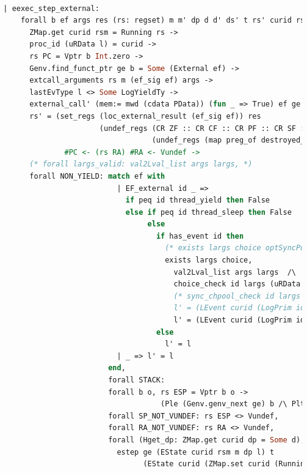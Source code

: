 \begin{lstlisting}[language=Caml]

  | eexec_step_external:
      forall b ef args res (rs: regset) m m' dp d d' ds' t rs' curid rsm l l',
        ZMap.get curid rsm = Running rs ->
        proc_id (uRData l) = curid ->
        rs PC = Vptr b Int.zero ->
        Genv.find_funct_ptr ge b = Some (External ef) ->
        extcall_arguments rs m (ef_sig ef) args ->
        lastEvType l <> Some LogYieldTy ->
        external_call' (mem:= mwd (cdata PData)) (fun _ => True) ef ge args (m, (uRData l, d)) t res (m', (ds',d')) ->
        rs' = (set_regs (loc_external_result (ef_sig ef)) res 
                        (undef_regs (CR ZF :: CR CF :: CR PF :: CR SF :: CR OF :: nil)
                                    (undef_regs (map preg_of destroyed_at_call) rs))) 
                #PC <- (rs RA) #RA <- Vundef ->
        (* forall largs_valid: val2Lval_list args largs, *)
        forall NON_YIELD: match ef with
                            | EF_external id _ => 
                              if peq id thread_yield then False
                              else if peq id thread_sleep then False
                                   else
                                     if has_event id then
                                       (* exists largs choice optSyncPool, *)
                                       exists largs choice,
                                         val2Lval_list args largs  /\
                                         choice_check id largs (uRData l) d = choice /\ 
                                         (* sync_chpool_check id largs (uRData l) d = optSyncPool /\  
                                         l' = (LEvent curid (LogPrim id largs choice optSyncPool) :: l) *)
                                         l' = (LEvent curid (LogPrim id largs choice (snap_func d)) :: l) 
                                     else
                                       l' = l
                            | _ => l' = l
                          end,
                          forall STACK:
                          forall b o, rs ESP = Vptr b o ->
                                      (Ple (Genv.genv_next ge) b /\ Plt b (Mem.nextblock m)),
                          forall SP_NOT_VUNDEF: rs ESP <> Vundef,
                          forall RA_NOT_VUNDEF: rs RA <> Vundef,
                          forall (Hget_dp: ZMap.get curid dp = Some d),
                            estep ge (EState curid rsm m dp l) t 
                                  (EState curid (ZMap.set curid (Running rs') rsm) m' (ZMap.set curid (Some d') dp) l')
\end{lstlisting}


